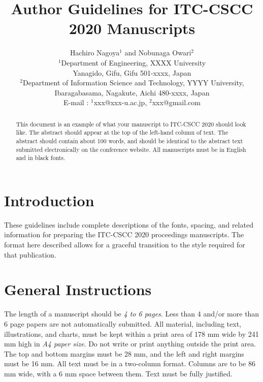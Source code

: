 \documentclass[10pt,twocolumn]{conference}
\begin{document}
\title{\bf Author Guidelines for ITC-CSCC 2020 Manuscripts}

\author{Hachiro Nagoya$^1$ and Nobunaga Owari$^2$ \\
\normalsize 
$^1$Department of Engineering, XXXX University \\
Yanagido, Gifu, Gifu 501-xxxx, Japan \\
$^2$Department of Information Science and Technology, YYYY University, \\
Ibaragabasama, Nagakute, Aichi 480-xxxx, Japan \\
E-mail : $^1$xxx@xxx-u.ac.jp, $^2$xxx@gmail.com }

\maketitle

\thispagestyle{empty}

\begin{abstract}
This document is an example of what your manuscript to ITC-CSCC 2020 should look like. The abstract should appear at the top of the left-hand column of text. The abstract should contain about 100 words, and should be identical to the abstract text submitted electronically on the conference website. All manuscripts must be in English and in black fonts.
\end{abstract}

\vspace{0.3em}

\section{Introduction}
\noindent
These guidelines include complete descriptions of the fonts, spacing, and related information for preparing the ITC-CSCC 2020 proceedings manuscripts.  The format here described allows for a graceful transition to the style required for that publication.

\section{General Instructions}
\noindent
The length of a manuscript should be {\em 4 to 6 pages}. Less than 4 and/or more than 6 page papers are not automatically submitted. All material, including text, illustrations, and charts, must be kept within a print area of 178 mm wide by 241 mm high in {\em A4 paper size}.  Do not write or print anything outside the print area.  The top and bottom margins must be 28 mm, and the left and right margins must be 16 mm.  All text must be in a two-column format. Columns are to be 86 mm wide, with a 6 mm space between them.  Text must be fully justified.
\end{document}
